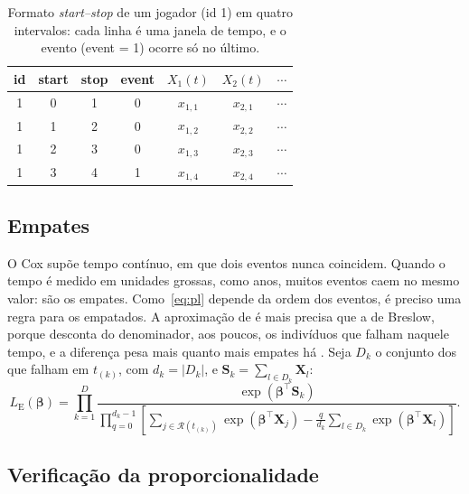 \begin{table}[H]
\centering
\caption{Formato \textit{start--stop} de um jogador (id 1) em quatro intervalos: cada linha é uma janela de tempo, e o evento (event = 1) ocorre só no último.}
\label{tab:startstop}
\begin{tabular}{ccccccc}
\toprule
\textbf{id} & \textbf{start} & \textbf{stop} & \textbf{event}
            & $X_1(t)$ & $X_2(t)$ & $\cdots$ \\
\midrule
1 & 0 & 1 & 0 & $x_{1,1}$ & $x_{2,1}$ & $\cdots$ \\
1 & 1 & 2 & 0 & $x_{1,2}$ & $x_{2,2}$ & $\cdots$ \\
1 & 2 & 3 & 0 & $x_{1,3}$ & $x_{2,3}$ & $\cdots$ \\
1 & 3 & 4 & 1 & $x_{1,4}$ & $x_{2,4}$ & $\cdots$ \\
\bottomrule
\end{tabular}
\end{table}

    \subsection{Empates}
    \label{subsec:empates}

O Cox supõe tempo contínuo, em que dois eventos nunca coincidem. Quando o tempo é medido em unidades grossas, como anos, muitos eventos caem no mesmo valor: são os empates. Como~\eqref{eq:pl} depende da ordem dos eventos, é preciso uma regra para os empatados. A aproximação de \citet{efron1977} é mais precisa que a de Breslow, porque desconta do denominador, aos poucos, os indivíduos que falham naquele tempo, e a diferença pesa mais quanto mais empates há \citep{breslow1974}. Seja $D_k$ o conjunto dos que falham em $t_{(k)}$, com $d_k = |D_k|$, e $\mathbf{S}_k = \sum_{l \in D_k} \mathbf{X}_l$:
\begin{equation}
    L_{\mathrm{E}}(\boldsymbol{\beta})
    = \prod_{k=1}^{D}
      \frac{\exp\!\left(\boldsymbol{\beta}^{\top}\mathbf{S}_k\right)}
           {\displaystyle\prod_{q=0}^{d_k-1}
            \left[\sum_{j \in \mathcal{R}(t_{(k)})} \exp\!\left(\boldsymbol{\beta}^{\top}\mathbf{X}_j\right)
            - \frac{q}{d_k}\sum_{l \in D_k} \exp\!\left(\boldsymbol{\beta}^{\top}\mathbf{X}_l\right)\right]}.
    \label{eq:pl_efron}
\end{equation}

    \subsection{Verificação da proporcionalidade}
    \label{subsec:schoenfeld_c2}

